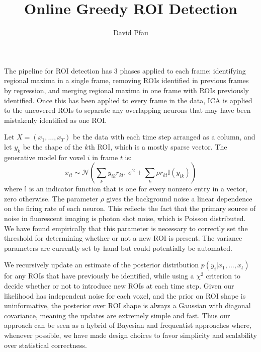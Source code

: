 \documentclass[11pt]{amsart}
\title{Online Greedy ROI Detection}
\author{David Pfau}
\begin{document}
\maketitle

The pipeline for ROI detection has 3 phases applied to each frame: identifying regional maxima in a single frame, removing ROIs identified in previous frames by regression, and merging regional maxima in one frame with ROIs previously identified. Once this has been applied to every frame in the data, ICA is applied to the uncovered ROIs to separate any overlapping neurons that may have been mistakenly identified as one ROI.

Let $X=(x_1,\ldots,x_T)$ be the data with each time step arranged as a column, and let $y_k$ be the shape of the $k$th ROI, which is a mostly sparse vector. The generative model for voxel $i$ in frame $t$ is:
\begin{equation}
x_{it} \sim  \mathcal{N}\left(\sum_k y_{ik} r_{kt},\, \sigma^2 + \sum_k \rho r_{kt}\mathbb{I}(y_{ik})\right)
\label{eqn:roi_generative_model}
\end{equation}
where $\mathbb{I}$ is an indicator function that is one for every nonzero entry in a vector, zero otherwise. The parameter $\rho$ gives the background noise a linear dependence on the firing rate of each neuron. This reflects the fact that the primary source of noise in fluorescent imaging is photon shot noise, which is Poisson distributed. We have found empirically that this parameter is necessary to correctly set the threshold for determining whether or not a new ROI is present. The variance parameters are currently set by hand but could potentially be automated.

We recursively update an estimate of the posterior distribution $p(y_{i}|x_1,\ldots,x_t)$ for any ROIs that have previously be identified, while using a $\chi^2$ criterion to decide whether or not to introduce new ROIs at each time step. Given our likelihood has independent noise for each voxel, and the prior on ROI shape is uninformative, the posterior over ROI shape is always a Gaussian with diagonal covariance, meaning the updates are extremely simple and fast. Thus our approach can be seen as a hybrid of Bayesian and frequentist approaches where, whenever possible, we have made design choices to favor simplicity and scalability over statistical correctness.
\end{document}
